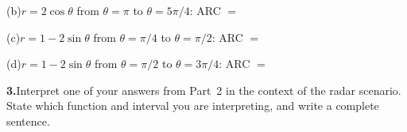 \documentclass[10pt]{article}
\begin{document}
\begin{tcolorbox}[colback=white, colframe=black!40,
    title=\textbf{Tier A --- Apply},
    fonttitle=\bfseries, arc=2mm, left=3mm, right=3mm, top=2mm, bottom=2mm]
\vspace{4pt}
(b)\quad $r = 2\cos\theta$ from $\theta = \pi$ to $\theta = 5\pi/4$:
\quad ARC $= $ \underline{\hspace{4cm}}

\vspace{4pt}
(c)\quad $r = 1 - 2\sin\theta$ from $\theta = \pi/4$ to $\theta = \pi/2$:
\quad ARC $= $ \underline{\hspace{4cm}}

\vspace{4pt}
(d)\quad $r = 1 - 2\sin\theta$ from $\theta = \pi/2$ to $\theta = 3\pi/4$:
\quad ARC $= $ \underline{\hspace{4cm}}

\vspace{8pt}
\textbf{3.}\quad Interpret one of your answers from Part~2 in the context of the radar scenario.
State which function and interval you are interpreting, and write a complete sentence.


\end{tcolorbox}

\vspace{0.08in}
\end{document}
